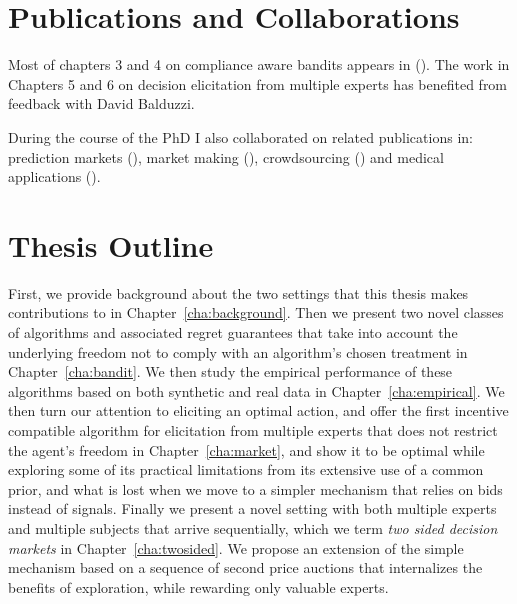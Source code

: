 \section{Publications and Collaborations}

Most of chapters 3 and 4 on compliance aware bandits appears in (\cite{della2016compliance}). The work in Chapters 5 and 6 on decision elicitation from multiple experts has benefited from feedback with David Balduzzi.

During the course of the PhD I also collaborated on related publications in: prediction markets (\cite{frongillo2012interpreting}), market making (\cite{kinathil2014closed,kinathil2016symbolic}), crowdsourcing (\cite{della2012crowd}) and medical applications (\cite{della2016out}).


\section{Thesis Outline}
\label{sec:outline}

First, we provide background about the two settings that this thesis makes contributions to in  Chapter~\ref{cha:background}. Then we present two novel classes of algorithms and associated regret guarantees that take into account the underlying freedom not to comply with an algorithm's chosen treatment in Chapter~\ref{cha:bandit}. We then study the empirical performance  of these algorithms based on both synthetic and real data in Chapter~\ref{cha:empirical}.
We then turn our attention to eliciting an optimal action, and offer the first incentive compatible algorithm for elicitation from multiple experts that does not restrict the agent's freedom in Chapter~\ref{cha:market}, and show it to be optimal while exploring some of its practical limitations from its extensive use of a common prior, and what is lost when we move to a simpler mechanism that relies on bids instead of signals.
Finally we present a novel setting with both multiple experts and multiple subjects that arrive sequentially, which we term \emph{two sided decision markets} in Chapter~\ref{cha:twosided}. We propose an extension of the simple mechanism based on a sequence of second price auctions that internalizes the benefits of exploration, while rewarding only valuable experts.

